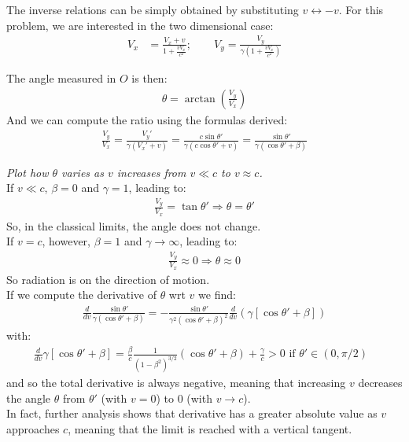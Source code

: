 \documentclass[../template.tex]{subfiles}
\begin{document}
The inverse relations can be simply obtained by substituting $v \leftrightarrow -v$. For this problem, we are interested in the two dimensional case:
\begin{align*}
    V_x &= \frac{V_x + v}{1 + \frac{v V_x}{c^2} }; \qquad V_y = \frac{V_y}{\gamma \left(1+\frac{vV_x}{c^2} \right)} 
\end{align*} 

The angle measured in $O$ is then:
\begin{align*}
    \theta = \arctan\left(\frac{V_y}{V_x} \right)
\end{align*} 
And we can compute the ratio using the formulas derived:
\begin{align*}
    \frac{V_y}{V_x} = \frac{V_y'}{\gamma (V_x' + v)} = \frac{c \sin \theta'}{\gamma(c \cos\theta' + v)} = \frac{\sin\theta'}{\gamma (\cos \theta' + \beta)}    
\end{align*}

\textit{Plot how $\theta$ varies as $v$ increases from $v \ll c$ to $v \approx c$.}\\
If $v \ll c$, $\beta = 0$ and $\gamma = 1$, leading to:
\begin{align*}
    \frac{V_y}{V_x} = \tan\theta' \Rightarrow \theta = \theta'
\end{align*}    
So, in the classical limits, the angle does not change.\\
If $v = c$, however, $\beta= 1$ and $\gamma \to \infty$, leading to:
\begin{align*}
    \frac{V_y}{V_x} \approx 0 \Rightarrow \theta \approx 0 
\end{align*}   
So radiation is  on the direction of motion.\\
If we compute the derivative of $\theta$ wrt $v$ we find:
\begin{align*}
    \frac{d}{dv} \frac{\sin \theta'}{\gamma(\cos \theta' + \beta)} = -\frac{\sin\theta'}{\gamma^2(\cos\theta' + \beta)^2} \frac{d}{dv} (\gamma[\cos\theta' + \beta])
\end{align*}  
with:
\begin{align*}
    \frac{d}{dv} \gamma [\cos\theta' + \beta] = \frac{\beta}{c}\frac{1}{(1-\beta^2)^{3/2}} (\cos\theta' + \beta) + \frac{\gamma}{c}  > 0 \text{ if $\theta' \in (0, \pi/2)$ }
\end{align*}
and so the total derivative is always negative, meaning that increasing $v$ decreases the angle $\theta$ from $\theta'$ (with $v=0$) to $0$ (with $v \to c$).\\
In fact, further analysis shows that derivative has a greater absolute value as $v$ approaches $c$, meaning that the limit is reached with a vertical tangent.\\
\end{document}
